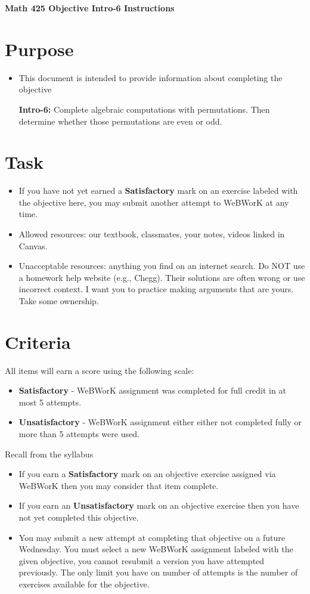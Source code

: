 \documentclass[12pt]{article}
\begin{document}
	\begin{center}
		{\Large \bf Math 425 Objective Intro-6 Instructions}
	\end{center}
	\section*{Purpose}
	\begin{itemize}
		\item This document is intended to provide information about completing the objective
		
			\textbf{Intro-6:} Complete algebraic computations with permutations. Then determine whether those permutations are even or odd.

	\end{itemize}
	\section*{Task}
	\begin{itemize}
		\item If you have not yet earned a \textbf{Satisfactory} mark on an exercise labeled with the objective here, you may submit another attempt to WeBWorK at any time.
		\item Allowed resources: our textbook, classmates, your notes, videos linked in Canvas.
		\item Unacceptable resources: anything you find on an internet search. Do NOT use a homework help website (e.g., Chegg). Their solutions are often wrong or use incorrect context.  I want you to practice making arguments that are yours. Take some ownership.
	\end{itemize}
	\section*{Criteria}
	All items will earn a score using the following scale:
	\begin{itemize}
		\item \textbf{Satisfactory} - WeBWorK assignment was completed for full credit in at most 5 attempts.
		\item \textbf{Unsatisfactory} - WeBWorK assignment either either not completed fully or more than 5 attempts were used.
	\end{itemize}
	Recall from the syllabus
	\begin{itemize}
		\item If you earn a \textbf{Satisfactory} mark on an objective exercise assigned via WeBWorK  then you may consider that item complete. 
		\item If you earn an \textbf{Unsatisfactory} mark on an objective exercise then you have not yet completed this objective.
		\item You may submit a new attempt at completing that objective on a future Wednesday. You must select a new WeBWorK assignment labeled with the given objective, you cannot resubmit a version you have attempted previously.  The only limit you have on number of attempts is the number of exercises available for the objective.
	\end{itemize}
	
\end{document}

